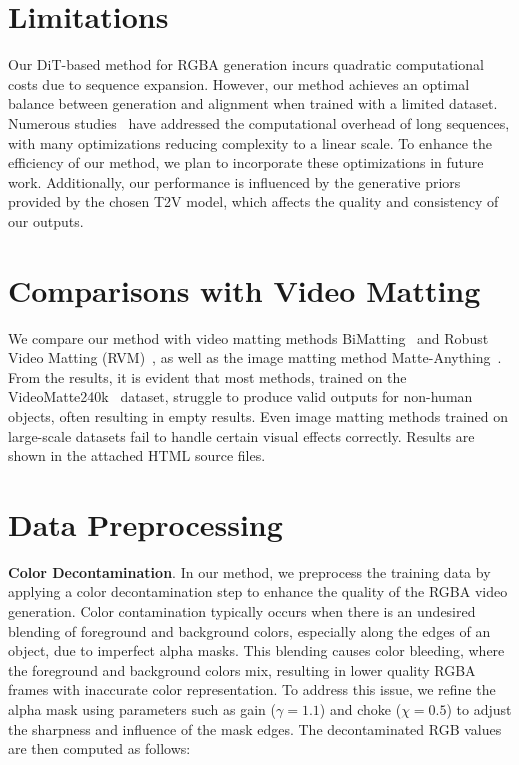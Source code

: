 \clearpage
\setcounter{page}{1}
\maketitlesupplementary
\section{Limitations}
\label{sec:limitations}
Our DiT-based method for RGBA generation incurs quadratic computational costs due to sequence expansion. However, our method achieves an optimal balance between generation and alignment when trained with a limited dataset. Numerous studies~\cite{wang2020linformer, ding2023longnet, zhu2021long} have addressed the computational overhead of long sequences, with many optimizations reducing complexity to a linear scale. To enhance the efficiency of our method, we plan to incorporate these optimizations in future work. Additionally, our performance is influenced by the generative priors provided by the chosen T2V model, which affects the quality and consistency of our outputs.

\section{Comparisons with Video Matting}
\label{sec:comparisons}
We compare our method with video matting methods BiMatting~\cite{qin2023bimatting} and Robust Video Matting (RVM)~\cite{lin2022robust}, as well as the image matting method Matte-Anything~\cite{yao2024matte}. From the results, it is evident that most methods, trained on the VideoMatte240k~\cite{lin2021real} dataset, struggle to produce valid outputs for non-human objects, often resulting in empty results. Even image matting methods trained on large-scale datasets fail to handle certain visual effects correctly. Results are shown in the attached HTML source files.

\section{Data Preprocessing}
\label{sec:data-preprocessing}
\noindent\textbf{Color Decontamination}. In our method, we preprocess the training data by applying a color decontamination step to enhance the quality of the RGBA video generation. Color contamination typically occurs when there is an undesired blending of foreground and background colors, especially along the edges of an object, due to imperfect alpha masks. This blending causes color bleeding, where the foreground and background colors mix, resulting in lower quality RGBA frames with inaccurate color representation. To address this issue, we refine the alpha mask using parameters such as gain ($\gamma=1.1$) and choke ($\chi=0.5$) to adjust the sharpness and influence of the mask edges. The decontaminated RGB values are then computed as follows:

